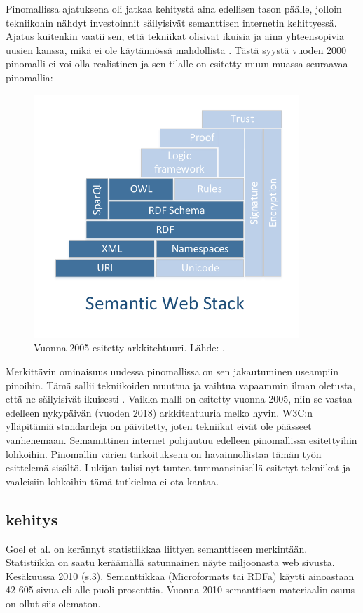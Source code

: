 \documentclass[finnish, 12pt, a4paper, elec, utf8, pdfa, online]{aaltothesis}
\begin{document}
{Pinomallissa ajatuksena oli jatkaa kehitystä aina edellisen tason päälle, jolloin tekniikohin nähdyt investoinnit säilyisivät semanttisen internetin kehittyessä. Ajatus kuitenkin vaatii sen, että tekniikat olisivat ikuisia ja aina yhteensopivia uusien kanssa, mikä ei ole käytännössä mahdollista \cite{stack}. Tästä syystä vuoden 2000 pinomalli ei voi olla realistinen ja sen tilalle on esitetty muun muassa seuraavaa pinomallia:

\begin{figure}[htb]
\centering
\includegraphics[width=10cm]{images/sweb-stack2.pdf}
\caption{Vuonna 2005 esitetty arkkitehtuuri. Lähde: \cite{stack}. \label{images/sweb-stack2.pdf}}
\end{figure}

Merkittävin ominaisuus uudessa pinomallissa on sen jakautuminen useampiin pinoihin. Tämä sallii tekniikoiden muuttua ja vaihtua vapaammin ilman oletusta, että ne säilyisivät ikuisesti \cite{stack}. Vaikka malli on esitetty vuonna 2005, niin se vastaa edelleen nykypäivän (vuoden 2018) arkkitehtuuria melko hyvin. W3C:n ylläpitämiä standardeja on päivitetty, joten tekniikat eivät ole päässeet vanhenemaan. Semannttinen internet pohjautuu edelleen pinomallissa esitettyihin lohkoihin. Pinomallin värien tarkoituksena on havainnollistaa tämän työn esittelemä sisältö. Lukijan tulisi nyt tuntea tummansinisellä esitetyt tekniikat ja vaaleisiin lohkoihin tämä tutkielma ei ota kantaa.


\clearpage %

\subsection{kehitys}
Goel et al. on kerännyt statistiikkaa liittyen semanttiseen merkintään. Statistiikka on saatu keräämällä satunnainen näyte miljoonasta web sivusta. Kesäkuussa 2010 \cite{Google} (s.3). Semanttikkaa (Microformats tai RDFa) käytti ainoastaan 42 605 sivua eli alle puoli prosenttia. Vuonna 2010 semanttisen materiaalin osuus on ollut siis olematon.

}
\end{document}
